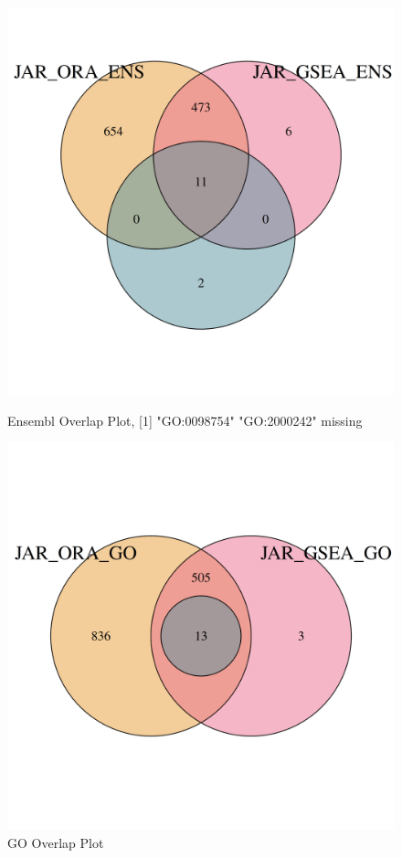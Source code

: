 \documentclass[12pt]{article}
\begin{document}
\begin{figure}[htpb]
    \centering
    \begin{minipage}{0.49\textwidth}
        \centering
        \includegraphics[width=\textwidth]{./plots/ensOverlap.png}
        \caption{Ensembl Overlap Plot, [1] "GO:0098754" "GO:2000242" missing}

        \label{fig:ens-overlap}
    \end{minipage}
    \hfill
    \begin{minipage}{0.49\textwidth}
        \centering
        \includegraphics[width=\textwidth]{./plots/goOverlap.png}
        \caption{GO Overlap Plot}
        \label{fig:go-overlap}
    \end{minipage}
\end{figure}
\end{document}
